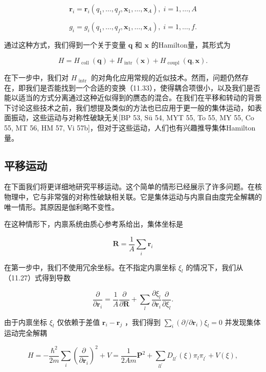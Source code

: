 \[
{\boldsymbol{r}}_{i}={\boldsymbol{r}}_{i}\left({{q}_{1},\ldots,{q}_{f},{\boldsymbol{x}}_{1},\ldots,{\boldsymbol{x}}_{A}}\right),\;i=1,\ldots,A
\]

\[
{g}_{i}={g}_{i}\left({{q}_{1},\ldots,{q}_{f},{\boldsymbol{x}}_{1},\ldots,{\boldsymbol{x}}_{A}}\right),\;i=1,\ldots,f.\tag{11.33}
\]

通过这种方式，我们得到一个关于变量 $\boldsymbol{q}$ 和 $\boldsymbol{x}$ 的Hamilton量，其形式为

\[
H={H}_{\text{ coll }}\left(\boldsymbol{q}\right)+{H}_{\text{ intr }}\left(\boldsymbol{x}\right)+{H}_{\text{ coupl }}\left({\boldsymbol{q},\boldsymbol{x}}\right).\tag{11.34}
\]

在下一步中，我们对 ${H}_{\text{ intr }}$ 的对角化应用常规的近似技术。然而，问题仍然存在，即我们是否能找到一个合适的变换（11.33），使得耦合项很小，以及我们是否能以适当的方式分离通过这种近似得到的赝态的混合。在我们在平移和转动的背景下讨论这些技术之前，我们想提及类似的方法也已应用于更一般的集体运动，如表面振动，这些运动与对称性破缺无关{[}BP
53, Sü 54, MYT 55, To 55, MY 55, Co 55, MT 56, HM 57, Vi 57b{]}，但对于这些运动，人们也有兴趣推导集体Hamilton量。

\subsection{平移运动}

在下面我们将更详细地研究平移运动。这个简单的情形已经展示了许多问题。在核物理中，它与非常强的对称性破缺相关联。它是集体运动与内禀自由度完全解耦的唯一情形。其原因是伽利略不变性。

在这种情形下，内禀系统由质心参考系给出，集体坐标是

\[
\boldsymbol{R}=\frac{1}{A}\mathop{\sum}\limits_{i}{\boldsymbol{r}}_{i}\tag{11.35}
\]

在第一步中，我们不使用冗余坐标。在不指定内禀坐标 ${\xi}_{l}$ 的情况下，我们从（11.27）式得到导数

\[
\frac{\partial}{\partial{\boldsymbol{r}}_{i}}=\frac{1}{A}\frac{\partial}{\partial\boldsymbol{R}}+\mathop{\sum}\limits_{l}\frac{\partial{\xi}_{l}}{\partial{\boldsymbol{r}}_{i}}\frac{\partial}{\partial{\xi}_{l}}.\tag{11.36}
\]

由于内禀坐标 ${\xi}_{l}$ 仅依赖于差值 ${\boldsymbol{r}}_{i}-{\boldsymbol{r}}_{j}$
，我们得到 $\mathop{\sum}\limits_{i}\left({\partial/\partial{\boldsymbol{r}}_{i}}\right){\xi}_{l}=0$
并发现集体运动完全解耦

\[
H=-\frac{{\hbar}^{2}}{2m}\mathop{\sum}\limits_{i}{\left(\frac{\partial}{\partial{\boldsymbol{r}}_{i}}\right)}^{2}+V=\frac{1}{2Am}{\boldsymbol{P}}^{2}+\mathop{\sum}\limits_{{l{l}^{\prime}}}{D}_{l{l}^{\prime}}\left(\xi\right){\pi}_{l}{\pi}_{{l}^{\prime}}+V\left(\xi\right),\tag{11.37}
\]

